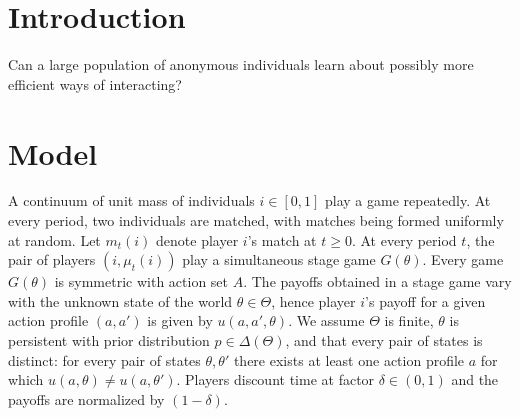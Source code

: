 \documentclass[12pt,letterpaper]{article}
\begin{document}
\doublespacing

\maketitle


\section{Introduction}
Can a large population of anonymous individuals learn about possibly more efficient ways of interacting? 

\section{Model}

A continuum of unit mass of individuals $i\in[0,1]$ play a game repeatedly. At every period, two individuals are matched, with matches being formed uniformly at random. Let $m_t(i)$ denote player $i$'s match at $t\geq 0$. At every period $t$, the pair of players $(i,\mu_t(i))$ play a simultaneous stage game $G(\theta)$. Every game $G(\theta)$ is symmetric with action set $A$. The payoffs obtained in a stage game vary with the unknown state of the world $\theta\in\Theta$, hence player $i$'s payoff for a given action profile $(a,a')$ is given by $u(a,a',\theta)$. We assume $\Theta$ is finite, $\theta$ is persistent with prior distribution $p\in \Delta(\Theta)$, and that every pair of states is distinct: for every pair of states $\theta,\theta'$ there exists at least one action profile $a$ for which $u(a,\theta)\ne u(a,\theta')$. Players discount time at factor $\delta\in(0,1)$ and the payoffs are normalized by $(1-\delta)$. 
\end{document}
